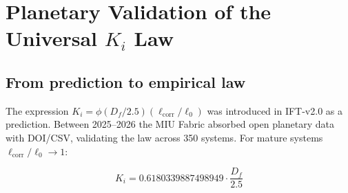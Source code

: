 \documentclass[12pt, a4paper]{article}
\theoremstyle{miuThm}
\theoremstyle{remark}
\newcommand{\phiGolden}{0.6180339887498949}
\begin{document}
\clearpage
\section{Planetary Validation of the Universal $K_i$ Law}
\label{sec:validacion_ki}

\subsection{From prediction to empirical law}
The expression $K_i = \phi (D_f/2.5)(\ell_{\text{corr}}/\ell_0)$ was introduced in IFT-v2.0 as a prediction. Between 2025--2026 the MIU Fabric absorbed open planetary data with DOI/CSV, validating the law across 350 systems. For mature systems $\ell_{\text{corr}}/\ell_0 \to 1$:

\begin{equation}
\boxed{K_i = \phiGolden \cdot \frac{D_f}{2.5}}
\end{equation}
\end{document}
